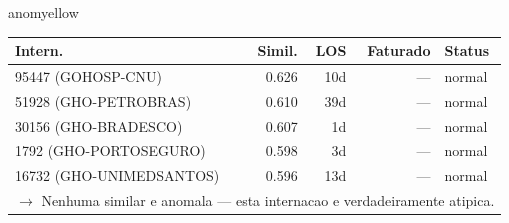 \documentclass[a4paper,10pt]{article}
\begin{document}
\begin{anomalycard}[Internacao 183487 | PASA | MODERADO (z=2.49)]{anomyellow}
\begin{tabular}{l r r r l}\toprule\textbf{Intern.} & \textbf{Simil.} & \textbf{LOS} & \textbf{Faturado} & \textbf{Status} \\\midrule
95447 (GOHOSP-CNU) & 0.626 & 10d & --- & \textcolor{jcubeblue}{normal} \\
51928 (GHO-PETROBRAS) & 0.610 & 39d & --- & \textcolor{jcubeblue}{normal} \\
30156 (GHO-BRADESCO) & 0.607 & 1d & --- & \textcolor{jcubeblue}{normal} \\
1792 (GHO-PORTOSEGURO) & 0.598 & 3d & --- & \textcolor{jcubeblue}{normal} \\
16732 (GHO-UNIMEDSANTOS) & 0.596 & 13d & --- & \textcolor{jcubeblue}{normal} \\
\multicolumn{5}{l}{\textcolor{jcubeblue}{\small $\rightarrow$ Nenhuma similar e anomala --- esta internacao e verdadeiramente atipica.}} \\
\bottomrule\end{tabular}


\end{anomalycard}

\newpage
\end{document}
